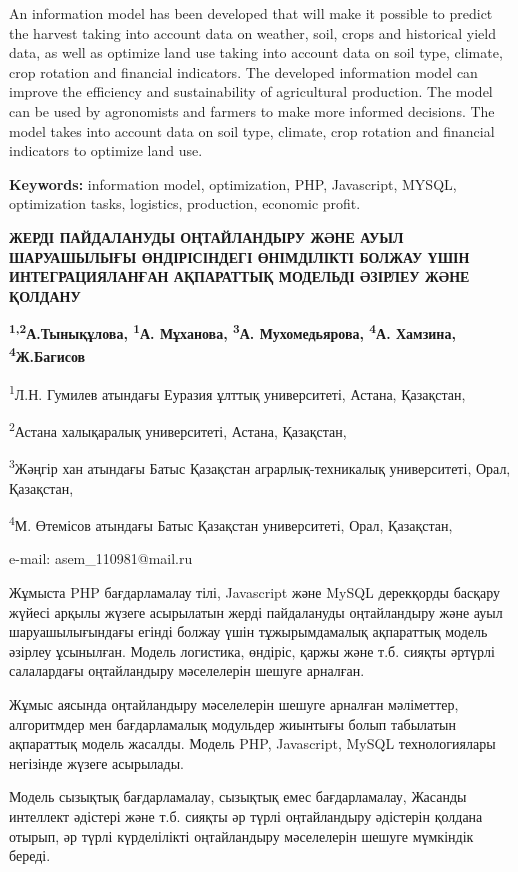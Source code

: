 An information model has been developed that will make it possible to
predict the harvest taking into account data on weather, soil, crops and
historical yield data, as well as optimize land use taking into account
data on soil type, climate, crop rotation and financial indicators. The
developed information model can improve the efficiency and
sustainability of agricultural production. The model can be used by
agronomists and farmers to make more informed decisions. The model takes
into account data on soil type, climate, crop rotation and financial
indicators to optimize land use.

{\bfseries Keywords:} information model, optimization, PHP, Javascript,
MYSQL, optimization tasks, logistics, production, economic profit.

{\bfseries ЖЕРДІ ПАЙДАЛАНУДЫ ОҢТАЙЛАНДЫРУ ЖӘНЕ АУЫЛ ШАРУАШЫЛЫҒЫ
ӨНДІРІСІНДЕГІ ӨНІМДІЛІКТІ БОЛЖАУ ҮШІН ИНТЕГРАЦИЯЛАНҒАН АҚПАРАТТЫҚ
МОДЕЛЬДІ ӘЗІРЛЕУ ЖӘНЕ ҚОЛДАНУ}

{\bfseries \textsuperscript{1,2}А.Тынықұлова, \textsuperscript{1}А.
Мұханова, \textsuperscript{3}А. Мухомедьярова, \textsuperscript{4}А.
Хамзина, \textsuperscript{4}Ж.Багисов}

\textsuperscript{1}Л.Н. Гумилев атындағы Еуразия ұлттық университеті,
Астана, Қазақстан,

\textsuperscript{2}Астана халықаралық университеті, Астана, Қазақстан,

\textsuperscript{3}Жәңгір хан атындағы Батыс Қазақстан
аграрлық-техникалық университеті, Орал, Қазақстан,

\textsuperscript{4}М. Өтемісов атындағы Батыс Қазақстан университеті,
Орал, Қазақстан,

e-mail: asem\_110981@mail.ru

Жұмыста PHP бағдарламалау тілі, Javascript және MySQL дерекқорды басқару
жүйесі арқылы жүзеге асырылатын жерді пайдалануды оңтайландыру және ауыл
шаруашылығындағы егінді болжау үшін тұжырымдамалық ақпараттық модель
әзірлеу ұсынылған. Модель логистика, өндіріс, қаржы және т.б. сияқты
әртүрлі салалардағы оңтайландыру мәселелерін шешуге арналған.

Жұмыс аясында оңтайландыру мәселелерін шешуге арналған мәліметтер,
алгоритмдер мен бағдарламалық модульдер жиынтығы болып табылатын
ақпараттық модель жасалды. Модель PHP, Javascript, MySQL технологиялары
негізінде жүзеге асырылады.

Модель сызықтық бағдарламалау, сызықтық емес бағдарламалау, Жасанды
интеллект әдістері және т.б. сияқты әр түрлі оңтайландыру әдістерін
қолдана отырып, әр түрлі күрделілікті оңтайландыру мәселелерін шешуге
мүмкіндік береді.

